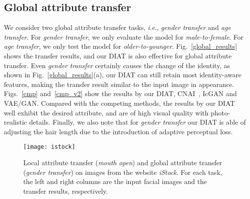 \documentclass[journal]{IEEEtran}
\newcommand{\ie}{\textit{i}.\textit{e}.}
\begin{document}
\subsection{Global attribute transfer}

We consider two global attribute transfer tasks, \ie, \emph{gender transfer} and \emph{age transfer}.
For \emph{gender transfer}, we only evaluate the model for \emph{male-to-female}.
For \emph{age transfer}, we only test the model for \emph{older-to-younger}.
Fig.~\ref{global_results} shows the transfer results, and our DIAT is also effective for global attribute transfer.
Even \emph{gender transfer} certainly causes the change of the identity, as shown in Fig.~\ref{global_results}(a), our DIAT can still retain most identity-aware features, making the transfer result similar to the input image in appearance.
Figs.~\ref{cmp} and~\ref{cmp_v2} show the results by our DIAT, CNAI~\cite{li2016convolutional}, IcGAN and VAE/GAN.
Compared with the competing methods, the results by our DIAT well exhibit the desired attribute, and are of high visual quality with photo-realistic details.
Finally, we also note that for \emph{gender transfer} our DIAT is able of adjusting the hair length due to the introduction of adaptive perceptual loss.







\begin{figure*}
\begin{center}
\texttt{[image: istock]}
\end{center}
   \caption{Local attribute transfer (\emph{mouth open}) and global attribute transfer (\emph{gender transfer}) on images from the website \emph{iStock}. For each task, the left and right columns are the input facial images and the transfer results, respectively.}
\label{other}
\end{figure*}
\end{document}
